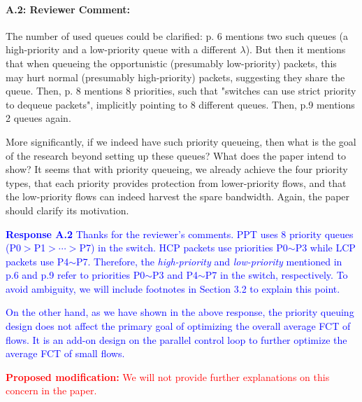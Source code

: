 \documentclass[12pt,one-column]{article}
\begin{document}
{\it \paragraph{A.2: Reviewer Comment:} The number of used queues could be clarified: p. 6 mentions two such queues (a high-priority and a low-priority queue with a different $\lambda$). But then it mentions that when queueing the opportunistic (presumably low-priority) packets, this may hurt normal (presumably high-priority) packets, suggesting they share the queue. Then, p. 8 mentions 8 priorities, such that "switches can use strict priority to dequeue packets", implicitly pointing to 8 different queues. Then, p.9 mentions 2 queues again.
	
More significantly, if we indeed have such priority queueing, then what is the goal of the research beyond setting up these queues? What does the paper intend to show? It seems that with priority queueing, we already achieve the four priority types, that each priority provides protection from lower-priority flows, and that the low-priority flows can indeed harvest the spare bandwidth. Again, the paper should clarify its motivation.}

\noindent\textcolor{blue}{\textbf{Response A.2}
Thanks for the reviewer's comments. 
PPT uses 8 priority queues (P0$>$P1$>\cdots>$P7) in the switch.
HCP packets use priorities P0$\sim$P3 while LCP packets use P4$\sim$P7.
Therefore, the \emph{high-priority} and \emph{low-priority} mentioned in p.6 and p.9 refer to priorities P0$\sim$P3 and P4$\sim$P7 in the switch, respectively.
To avoid ambiguity, we will include footnotes in Section 3.2 to explain this point.
} 

\textcolor{blue}{On the other hand, as we have shown in the above response, the priority queuing design does not affect the primary goal of optimizing the overall average FCT of flows. It is an add-on design on the parallel control loop to further optimize the average FCT of small flows.
}

\noindent\textcolor{red}{\textbf{Proposed modification: }
We will not provide further explanations on this concern in the paper.
}

\end{document}
